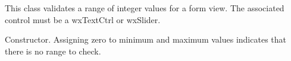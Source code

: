 \section{}\label{wxintegerformvalidator}

This class validates a range of integer values for a form view. The associated control must be a wxTextCtrl
or wxSlider.






Constructor. Assigning zero to minimum and maximum values indicates that there is no range to check.


